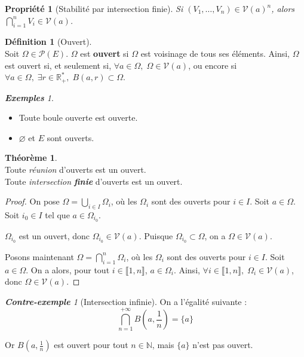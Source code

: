 \documentclass[12pt]{book}
\let\ensembleNombre\mathbb
\newcommand*\N{\ensuremath{\ensembleNombre{N}}}
\newcommand*\R{\ensuremath{\ensembleNombre{R}}}
\newtheorem*{prop}{Propriété}
\theoremstyle{definition}
\newtheorem*{defi}{Définition}
\newtheorem{thme}{Théorème}[chapter]
\theoremstyle{remark}
\newtheorem*{exs}{\textbf{Exemples}}
\newtheorem*{cex}{\textbf{Contre-exemple}}
\newenvironment{fdef}
  {\begin{mdframed}[roundcorner=10pt, linewidth=1pt]\begin{defi}}
  {\end{defi}\end{mdframed}}
\newenvironment{fthme}
  {\begin{mdframed}[roundcorner=10pt, linewidth=2pt]\begin{thme}}
  {\end{thme}\end{mdframed}}
\begin{document}
	\begin{prop}[Stabilité par intersection finie]
	Si $(V_1, \ldots, V_n) \in \mathcal V(a)^n$, alors $\bigcap_{i=1}^n V_i \in \mathcal V(a)$.
	\end{prop} \newpage
	
	\begin{fdef}[Ouvert]\mbox{~}\\
	Soit $\Omega \in \mathcal P(E)$. $\Omega$ est \textbf{ouvert} si $\Omega$ est voisinage de tous ses éléments. Ainsi, $\Omega$ est ouvert si, et seulement si, $\forall a \in \Omega,\; \Omega \in \mathcal V(a)$, ou encore si $\forall a \in \Omega, \; \exists r \in \R_+^*,\; B(a,r) \subset \Omega$.
	\end{fdef}
	
	\begin{exs}\mbox{~}\\
	\begin{itemize}
	\item Toute boule ouverte est ouverte.
	\item $\varnothing$ et $E$ sont ouverts.
	\end{itemize}
	\end{exs}
	
	\begin{fthme}\mbox{~}\\
	Toute \textit{réunion} d'ouverts est un ouvert.\\	
	Toute \textit{intersection \textbf{finie}} d'ouverts est un ouvert.
	\end{fthme}
	\begin{proof}
	On pose $\Omega = \bigcup_{i\in I} \Omega_i$, où les $\Omega_i$ sont des ouverts pour $i \in I$. Soit $a \in \Omega$. Soit $i_0 \in I$ tel que $a \in \Omega_{i_0}$. 
	
	$\Omega_{i_0}$ est un ouvert, donc $\Omega_{i_0} \in \mathcal V(a)$. Puisque $\Omega_{i_0} \subset \Omega$, on a $\boxed{\Omega \in \mathcal V(a).}$
	
	Posons maintenant $\Omega = \bigcap_{i=1}^n \Omega_i$, où les $\Omega_i$ sont des ouverts pour $i \in I$. Soit $a \in \Omega$. On a alors, pour tout $i \in \llbracket 1, n \rrbracket$, $a \in \Omega_i$. Ainsi, $\forall i \in \llbracket 1, n \rrbracket,\; \Omega_i \in \mathcal V(a)$, donc $\boxed{\Omega \in \mathcal V(a).}$
	\end{proof}
	
	\begin{cex}[Intersection infinie]
	On a l'égalité suivante : 
	\[\boxed{\bigcap_{n=1}^{+\infty} B\left( a, \frac{1}{n} \right) = \lbrace a \rbrace }\]
	
	Or $B\left(a, \frac{1}{n}\right)$ est ouvert pour tout $n \in \N$, mais $\lbrace a \rbrace$ n'est pas ouvert.
	\end{cex}
	
\end{document}
